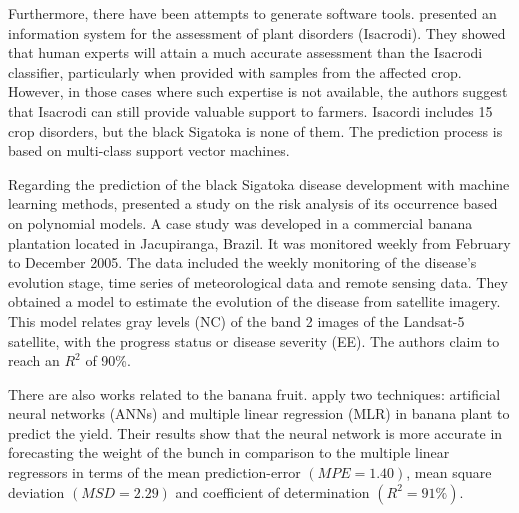 Furthermore, there have been attempts to generate software
tools. \citet{Camargo2012} presented an information
system for the assessment of plant disorders (Isacrodi).
%
They showed that human experts will attain a much accurate assessment
than the Isacrodi classifier, particularly when provided with samples
from the affected crop. However, in those cases where such expertise
is not available, the authors suggest that Isacrodi can still provide
valuable support to farmers.
%
Isacordi includes 15 crop disorders, but the black Sigatoka is none
of them. The prediction process is based on multi-class support vector
machines.

Regarding the prediction of the black Sigatoka disease development
with machine learning methods, \citet{Bendini2013} presented a study
on the risk analysis of its occurrence based on polynomial models.
%
A case study was developed in a commercial banana plantation located
in Jacupiranga, Brazil. It was monitored weekly from February to
December 2005.
%
The data included the weekly monitoring of the disease’s evolution
stage, time series of meteorological data and remote sensing
data.
%
They obtained a model to estimate the evolution of the disease from
satellite imagery. This model relates gray levels (NC) of the band 2
images of the Landsat-5 satellite, with the progress status or disease
severity (EE). The authors claim to reach an $R^2$ of 90\%.

There are also works related to the banana fruit. \citet{Soares2014}
apply two techniques: artificial neural networks (ANNs) and multiple
linear regression (MLR) in banana plant to predict the yield.
%
Their results show that the neural network is more accurate in
forecasting the weight of the bunch in comparison to the multiple
linear regressors in terms of the mean prediction-error $(MPE =
1.40)$, mean square deviation $(MSD = 2.29)$ and coefficient of
determination $(R^2 = 91\%)$.

%

